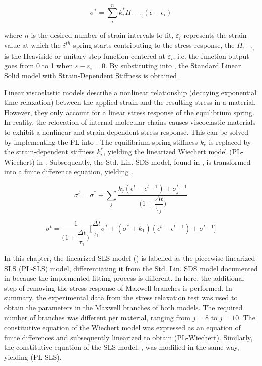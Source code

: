 \begin{equation}
\label{eq5}
\sigma^* = \sum_i^n k_i^* H_{\epsilon - \epsilon_i}(\epsilon - \epsilon_i)
\end{equation}

\noindent where $n$ is the desired number of strain intervals to fit, $\varepsilon_i$ represents the strain value at which the $i^{th}$ spring starts contributing to the stress response, the $H_{\epsilon - \epsilon_i}$ is the Heaviside or unitary step function centered at $\varepsilon_i$, i.e. the function output goes from 0 to 1 when $\varepsilon - \varepsilon_i = 0$. By substituting  into , the Standard Linear Solid model with Strain-Dependent Stiffness is obtained \cite{austin2015control}.

Linear viscoelastic models describe a nonlinear relationship (decaying exponential time relaxation) between the applied strain and the resulting stress in a material. However, they only account for a linear stress response of the equilibrium spring. In reality, the relocation of internal molecular chains causes viscoelastic materials to exhibit a nonlinear and strain-dependent stress response. This can be solved by implementing the PL into . The equilibrium spring stiffness $k_e$ is replaced by the strain-dependent stiffness $k_i^*$, yielding the linearized Wiechert model (PL-Wiechert) in . Subsequently, the Std. Lin. SDS model, found in \cite{austin2015control}, is transformed into a finite difference equation, yielding .

\begin{equation}
\label{eq6}
\sigma^t = \sigma^* + \sum_j \frac{k_j (\epsilon^t-\epsilon^{t-1}) + \sigma_j^{t-1}}{\bigg(1 + \dfrac{\Delta t}{\tau_j}\bigg)}
\end{equation}

\begin{equation}
\label{eq7}
\sigma^ t = \frac{1}{\bigg(1+\dfrac{\Delta t} {\tau_1} \bigg)} \Bigg[ \frac{\Delta t}{\tau_1} \sigma^* + (\sigma^* + k_1) (\epsilon^t-\epsilon^{t-1}) + \sigma^{t-1} \Bigg] 
\end{equation}

In this chapter, the linearized SLS model () is labelled as the piecewise linearized SLS (PL-SLS) model, differentiating it from the Std. Lin. SDS model documented in \cite{austin2015control} because the implemented fitting process is different. In here, the additional step of removing the stress response of Maxwell branches is performed. In summary, the experimental data from the stress relaxation test was used to obtain the parameters in the Maxwell branches of both models. The required number of branches was different per material, ranging from $j=8$ to $j=10$.  The constitutive equation of the Wiechert model was expressed as an equation of finite differences and subsequently linearized to obtain  (PL-Wiechert). Similarly, the constitutive equation of the SLS model, , was modified in the same way, yielding  (PL-SLS).

